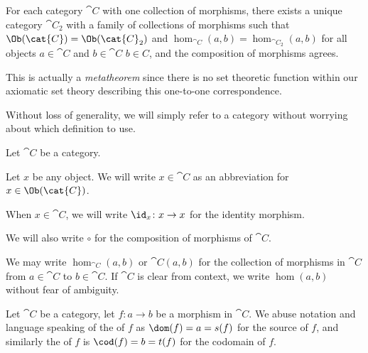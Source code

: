 \begin{theorem}
For each category $\cat{C}$ with one collection of morphisms, there
exists a unique category $\cat{C}_{2}$ with a family of collections of
morphisms such that $\Ob(\cat{C})=\Ob(\cat{C}_{2})$ and
$\hom_{\cat{C}}(a,b)=\hom_{\cat{C}_{2}}(a,b)$ for all objects
$a\in\cat{C}$ and $b\in\cat{C}$ $b\in C$,  and the composition of morphisms agrees.
\end{theorem}

This is actually a \emph{metatheorem} since there is no set theoretic
function within our axiomatic set theory describing this one-to-one
correspondence.

\begin{remark}
Without loss of generality, we will simply refer to a category without
worrying about which definition to use.
\end{remark}

\begin{definition}
Let $\cat{C}$ be a category.

Let $x$ be any object.
We will write $x\in\cat{C}$ as an abbreviation for $x\in\Ob(\cat{C})$.

When $x\in\cat{C}$, we will write $\id_{x}\colon x\to x$ for the
identity morphism.

We will also write $\circ$ for the composition of morphisms of $\cat{C}$.

We may write $\hom_{\cat{C}}(a,b)$ or $\cat{C}(a,b)$ for the
collection of morphisms in $\cat{C}$ from $a\in\cat{C}$ to $b\in\cat{C}$.
If $\cat{C}$ is clear from context, we write $\hom(a,b)$ without fear
of ambiguity.
\end{definition}

\begin{definition}\label{defn:cat:domain-and-codomain}
Let $\cat{C}$ be a category, let $f\colon a\to b$ be a morphism in
$\cat{C}$. We abuse notation and language speaking of the
 of $f$ as $\dom(f)=a=s(f)$ for the source of
$f$, and similarly the  of $f$ is $\cod(f)=b=t(f)$ for the codomain of $f$.
\end{definition}

